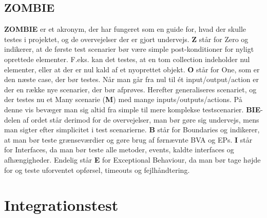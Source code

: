 \documentclass[Rapport/Rapport_main.tex]{subfiles}
\begin{document}
\subsection{ZOMBIE}
\textbf{ZOMBIE} er et akronym, der har fungeret som en guide for, hvad der skulle testes i projektet, og de overvejelser der er gjort undervejs. \textbf{Z} står for Zero og indikerer, at de første test scenarier bør være simple post-konditioner for nyligt oprettede elementer. F.eks. kan det testes, at en tom collection indeholder nul elementer, eller at der er nul kald af et nyoprettet objekt. \textbf{O} står for One, som er den næste case, der bør testes. Når man går fra nul til ét input/output/action er der en række nye scenarier, der bør afprøves. Herefter generaliseres scenariet, og der testes nu et Many scenarie (\textbf{M}) med mange inputs/outputs/actions. På denne vis bevæger man sig altid fra simple til mere komplekse testscenarier. \textbf{BIE}-delen af ordet står derimod for de overvejelser, man bør gøre sig undervejs, mens man sigter efter simplicitet i test scenarierne. \textbf{B} står for Boundaries og indikerer, at man bør teste grænseværdier og gøre brug af førnævnte BVA og EPs. \textbf{I} står for Interfaces, da man bør teste alle metoder, events, kaldte interfaces og afhængigheder. Endelig står \textbf{E} for Exceptional Behaviour, da man bør tage højde for og teste uforventet opførsel, timeouts og fejlhåndtering.

\section{Integrationstest}
\end{document}

